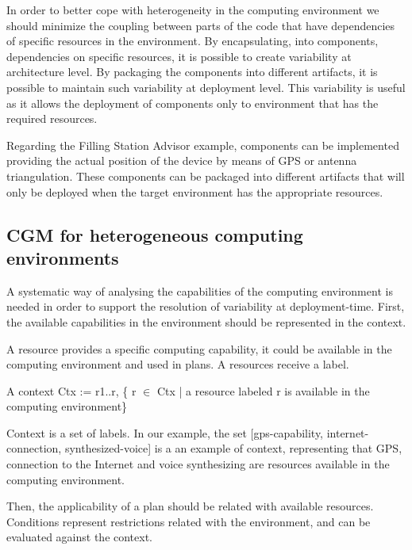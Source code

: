 In order to better cope with heterogeneity in the computing environment we should minimize the coupling between parts of the code that have dependencies of specific resources in the environment.
By encapsulating, into components, dependencies on specific resources, it is possible to create variability at architecture level. By packaging the components into different artifacts, it is possible to maintain such variability at deployment level. This variability is useful as it allows the deployment of components only to environment that has the required resources.

Regarding the Filling Station Advisor example, components can be implemented providing the actual position of the device by means of GPS or antenna triangulation. These components can be packaged into different artifacts that will only be deployed when the target environment has the appropriate resources.

\subsection{CGM for heterogeneous computing environments}
\label{context}

A systematic way of analysing the capabilities of the computing environment is needed in order to support the resolution of variability at deployment-time. First, the available capabilities in the environment should be represented in the context.

\begin{defn}[Resource]

  A resource provides a specific computing capability, it could be available in the computing environment and used in plans. A resources receive a label.

\end{defn}


\begin{defn}[Context]

  A context Ctx := r1..r, \{ r $\in$ Ctx | a resource labeled r is available in the computing environment\}
\end{defn}

Context is a set of labels. In our example, the set [gps-capability,
internet-connection, synthesized-voice] is a an example of context, representing that GPS, connection to the Internet and voice synthesizing are resources available in the computing environment.

Then, the applicability of a plan should be related with available resources. Conditions represent restrictions related with the environment, and can be evaluated against the context.

